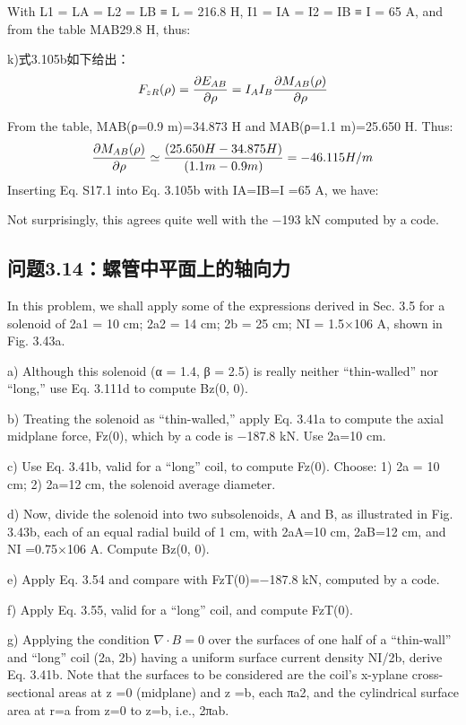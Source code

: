 With L1 = LA = L2 = LB ≡ L = 216.8 H, I1 = IA = I2 = IB ≡ I = 65 A, and from the
table MAB29.8 H, thus:


k)式3.105b如下给出：
$$
F_{zR}(\rho)=\frac{\partial E_{AB}}{\partial \rho}=I_{A}I_{B}\frac{\partial M_{AB}(\rho)}{\partial\rho}\\%
$$

From the table, MAB(ρ=0.9 m)=34.873 H and MAB(ρ=1.1 m)=25.650 H. Thus:
$$
\frac{\partial M_{AB}(\rho)}{\partial\rho}\simeq\frac{(25.650H-34.875H)}{(1.1m-0.9m)}=-46.115H/m\\%
$$
Inserting Eq. S17.1 into Eq. 3.105b with IA=IB=I =65 A, we have:

Not surprisingly, this agrees quite well with the −193 kN computed by a code.
\newpage


\subsection{问题3.14：螺管中平面上的轴向力}
In this problem, we shall apply some of the expressions derived in Sec. 3.5 for
a solenoid of 2a1 = 10 cm; 2a2 = 14 cm; 2b = 25 cm; NI = 1.5×106 A, shown in
Fig. 3.43a.

a) Although this solenoid (α = 1.4, β = 2.5) is really neither “thin-walled” nor
“long,” use Eq. 3.111d to compute Bz(0, 0).

b) Treating the solenoid as “thin-walled,” apply Eq. 3.41a to compute the axial
midplane force, Fz(0), which by a code is −187.8 kN. Use 2a=10 cm.

c) Use Eq. 3.41b, valid for a “long” coil, to compute Fz(0). Choose: 1) 2a =
10 cm; 2) 2a=12 cm, the solenoid average diameter.

d) Now, divide the solenoid into two subsolenoids, A and B, as illustrated in
Fig. 3.43b, each of an equal radial build of 1 cm, with 2aA=10 cm, 2aB=12 cm,
and NI =0.75×106 A. Compute Bz(0, 0).

e) Apply Eq. 3.54 and compare with FzT(0)=−187.8 kN, computed by a code.

f) Apply Eq. 3.55, valid for a “long” coil, and compute FzT(0).

g) Applying the condition $\nabla\cdot B=0$ over the surfaces of one half of a “thin-wall”
and “long” coil (2a, 2b) having a uniform surface current density NI/2b,
derive Eq. 3.41b. Note that the surfaces to be considered are the coil’s x-yplane cross-sectional areas at z =0 (midplane) and z =b, each πa2, and the
cylindrical surface area at r=a from z=0 to z=b, i.e., 2πab.

